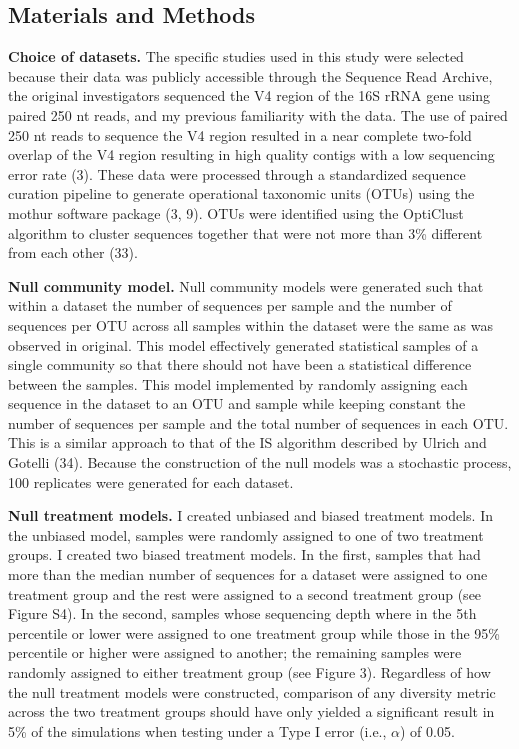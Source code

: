 \documentclass[
]{article}
\begin{document}
\hypertarget{materials-and-methods}{%
\subsection{Materials and Methods}\label{materials-and-methods}}

\textbf{Choice of datasets.} The specific studies used in this study
were selected because their data was publicly accessible through the
Sequence Read Archive, the original investigators sequenced the V4
region of the 16S rRNA gene using paired 250 nt reads, and my previous
familiarity with the data. The use of paired 250 nt reads to sequence
the V4 region resulted in a near complete two-fold overlap of the V4
region resulting in high quality contigs with a low sequencing error
rate (3). These data were processed through a standardized sequence
curation pipeline to generate operational taxonomic units (OTUs) using
the mothur software package (3, 9). OTUs were identified using the
OptiClust algorithm to cluster sequences together that were not more
than 3\% different from each other (33).

\textbf{Null community model.} Null community models were generated such
that within a dataset the number of sequences per sample and the number
of sequences per OTU across all samples within the dataset were the same
as was observed in original. This model effectively generated
statistical samples of a single community so that there should not have
been a statistical difference between the samples. This model
implemented by randomly assigning each sequence in the dataset to an OTU
and sample while keeping constant the number of sequences per sample and
the total number of sequences in each OTU. This is a similar approach to
that of the IS algorithm described by Ulrich and Gotelli (34). Because
the construction of the null models was a stochastic process, 100
replicates were generated for each dataset.

\textbf{Null treatment models.} I created unbiased and biased treatment
models. In the unbiased model, samples were randomly assigned to one of
two treatment groups. I created two biased treatment models. In the
first, samples that had more than the median number of sequences for a
dataset were assigned to one treatment group and the rest were assigned
to a second treatment group (see Figure S4). In the second, samples
whose sequencing depth where in the 5th percentile or lower were
assigned to one treatment group while those in the 95\% percentile or
higher were assigned to another; the remaining samples were randomly
assigned to either treatment group (see Figure 3). Regardless of how the
null treatment models were constructed, comparison of any diversity
metric across the two treatment groups should have only yielded a
significant result in 5\% of the simulations when testing under a Type I
error (i.e., \(\alpha\)) of 0.05.
\end{document}

